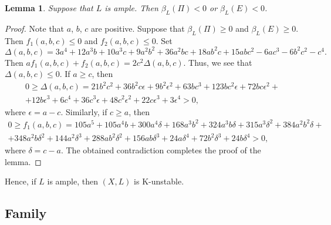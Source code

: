 \documentclass[12pt]{amsart}
\newtheorem{lemma}[theorem]{Lemma}
\theoremstyle{definition}
\theoremstyle{remark}
\begin{document}
\begin{lemma}
\label{lemma:3-18-unstable}
Suppose that $L$ is ample. Then $\beta_{L}(\Pi)<0$ or $\beta_{L}(E)<0$.
\end{lemma}

\begin{proof}
Note that $a$, $b$, $c$ are positive. Suppose that $\beta_{L}(\Pi)\geqslant 0$ and $\beta_{L}(E)\geqslant 0$. Then $f_1(a,b,c)\leqslant 0$ and $f_2(a,b,c)\leqslant 0$. Set
$$
\Delta(a,b,c)=3a^4+12a^3b+10a^3c+9a^2b^2+36a^2bc+18ab^2c+15abc^2-6ac^3-6b^2c^2-c^4.
$$
Then $af_1(a,b,c)+f_2(a,b,c)=2c^2\Delta(a,b,c)$. Thus, we see that $\Delta(a,b,c)\leqslant 0$. If $a\geqslant c$, then
\begin{multline*}
0\geqslant \Delta(a,b,c)=21b^2c^2+36b^2c\epsilon+9b^2\epsilon^2+63bc^3+123bc^2\epsilon+72bc\epsilon^2+\\
+12b\epsilon^3+6c^4+36c^3\epsilon+48c^2\epsilon^2+22c\epsilon^3+3\epsilon^4>0,
\end{multline*}
where $\epsilon=a-c$. Similarly, if $c\geqslant a$, then
\begin{multline*}
0\geqslant f_1(a,b,c)=105a^5+105a^4b+300a^4\delta+168a^3b^2+324a^3b\delta+315a^3\delta^2+384a^2b^2\delta+\\
+348a^2b\delta^2+144a^2\delta^3+288ab^2\delta^2+156ab\delta^3+24a\delta^4+72b^2\delta^3+24b\delta^4>0,
\end{multline*}
where $\delta=c-a$. The obtained contradiction completes the proof of the lemma.
\end{proof}

Hence, if $L$ is ample, then $(X,L)$ is K-unstable.


\subsection{Family }
\label{subsection:3-21}
\end{document}
